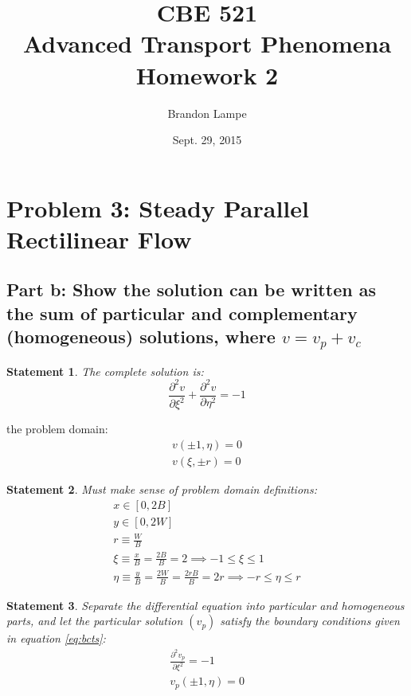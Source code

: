 \documentclass[10pt, reqno]{amsart}
\title{CBE 521\\ Advanced Transport Phenomena\\ Homework 2}
\author{Brandon Lampe}
\date{Sept. 29, 2015} %
\newtheorem{mydef}{Statement}
\begin{document}
\maketitle
\section{Problem 3: Steady Parallel Rectilinear Flow}
\subsection{Part b: Show the solution can be written as the sum of particular and complementary (homogeneous) solutions, where $v=v_p + v_c$}

\begin{mydef}
The complete solution is:
\begin{equation} \label{eq:PDE}
\frac{\partial^2 v}{\partial \xi^2}+\frac{\partial^2 v}{\partial \eta^2}=-1
\end{equation}
\end{mydef}

the problem domain:
\begin{gather} \label{eq:bcts}
 v(\pm1,\eta)=0\\
 v(\xi , \pm r)=0
 \end{gather}

\begin{mydef}
Must make sense of problem domain definitions:
\begin{gather}
 x \in [0, 2B] \\
 y\in [0,2W] \\
 r \equiv \frac{W}{B} \\
\xi \equiv \frac{x}{B} =\frac{2B}{B} = 2 \implies -1\le \xi \le 1\\
\eta \equiv \frac{y}{B} = \frac{2W}{B} = \frac{2rB}{B} = 2r \implies -r \le \eta \le r
\end{gather}
\end{mydef}

\begin{mydef}
Separate the differential equation into particular and homogeneous parts, and let the particular solution $(v_p)$ satisfy the boundary conditions given in equation \ref{eq:bcts}:
\begin{gather} \label{eq:part}
\frac{\partial^2 v_p}{\partial \xi^2} = -1\\
v_p(\pm 1, \eta) = 0
\end{gather}
\end{mydef}
\end{document}

